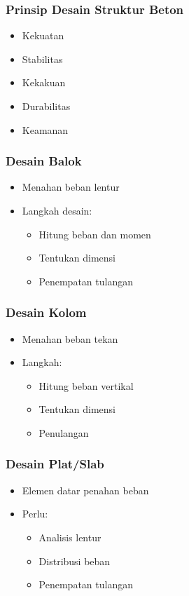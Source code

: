 \documentclass[../main.tex]{subfiles}
\begin{document}
\begin{frame}[mytitle=standard,t,mycolor=digiPH_ubcblue,dark]\frametitle{Prinsip Desain Struktur Beton}
	\begin{itemize}
		\item Kekuatan
		\item Stabilitas
		\item Kekakuan
		\item Durabilitas
		\item Keamanan
	\end{itemize}\end{frame}

\begin{frame}[mytitle=standard,t,mycolor=digiPH_uniblue,light]\frametitle{Desain Balok}
	\begin{itemize}
		\item Menahan beban lentur
		\item Langkah desain:
		      \begin{itemize}
			      \item Hitung beban dan momen
			      \item Tentukan dimensi
			      \item Penempatan tulangan
		      \end{itemize}
	\end{itemize}\end{frame}

\begin{frame}[mytitle=standard,t,mycolor=digiPH_red,dark]\frametitle{Desain Kolom}
	\begin{itemize}
		\item Menahan beban tekan
		\item Langkah:
		      \begin{itemize}
			      \item Hitung beban vertikal
			      \item Tentukan dimensi
			      \item Penulangan
		      \end{itemize}
	\end{itemize}\end{frame}

\begin{frame}[mytitle=standard,t,mycolor=digiPH_leaf,dark]\frametitle{Desain Plat/Slab}
	\begin{itemize}
		\item Elemen datar penahan beban
		\item Perlu:
		      \begin{itemize}
			      \item Analisis lentur
			      \item Distribusi beban
			      \item Penempatan tulangan
		      \end{itemize}
	\end{itemize}\end{frame}
\end{document}
